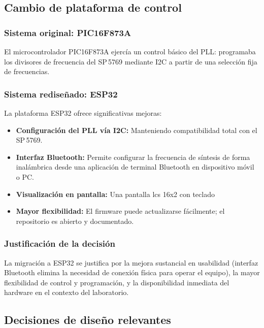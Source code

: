 \documentclass[12pt, a4paper]{article}
\begin{document}
	\subsection{Cambio de plataforma de control}
	
	\subsubsection{Sistema original: PIC16F873A}
	El microcontrolador PIC16F873A ejercía un control básico del PLL: programaba los divisores de
	frecuencia del SP\,5769 mediante I2C a partir de una selección fija de frecuencias.
	
	\subsubsection{Sistema rediseñado: ESP32}
	La plataforma ESP32 ofrece significativas mejoras:
	
	\begin{itemize}[leftmargin=*]
		\item \textbf{Configuración del PLL vía I2C:} Manteniendo compatibilidad total con el SP\,5769.
		\item \textbf{Interfaz Bluetooth:} Permite configurar la frecuencia de síntesis de forma inalámbrica
		desde una aplicación de terminal Bluetooth en dispositivo móvil o PC.
		\item \textbf{Visualización en pantalla:} Una pantalla lcs 16x2 con teclado
		\item \textbf{Mayor flexibilidad:} El firmware puede actualizarse fácilmente; el repositorio es abierto
		y documentado.
	\end{itemize}
	
	\subsubsection{Justificación de la decisión}
	La migración a ESP32 se justifica por la mejora sustancial en usabilidad (interfaz Bluetooth elimina la
	necesidad de conexión física para operar el equipo), la mayor flexibilidad de control y programación,
	y la disponibilidad inmediata del hardware en el contexto del laboratorio.
	
	\subsection{Decisiones de diseño relevantes}
	
\end{document}
